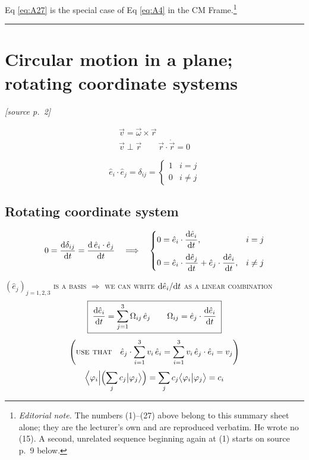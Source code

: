 \documentclass[11pt]{article}
\newcommand{\ehat}[1]{\hat{e}_{#1}}
\newcommand{\src}[1]{\par\nobreak\vspace{-4pt}\hfill{\footnotesize\itshape[source p.~#1]}\par\nobreak\vspace{2pt}}
\begin{document}
Eq \eqref{eq:A27} is the special case of Eq \eqref{eq:A4} in the CM Frame.\footnote{%
\emph{Editorial note.} The numbers (1)--(27) above belong to this summary sheet alone;
they are the lecturer's own and are reproduced verbatim. He wrote no (15). A second,
unrelated sequence beginning again at (1) starts on source p.~9 below.}

\bigskip\hrule\bigskip

\section*{Circular motion in a plane; rotating coordinate systems}
\src{2}

\begin{gather*}
\vec{v} = \vec{\omega}\times\vec{r}\\[2pt]
\vec{v}\perp\vec{r} \qquad \vec{r}\cdot\dot{\vec{r}} = 0
\end{gather*}

\begin{equation*}
\ehat{i}\cdot\ehat{j} = \delta_{ij} =
\begin{cases} 1 & i=j\\ 0 & i\neq j\end{cases}
\end{equation*}

\subsection*{Rotating coordinate system}

\begin{equation*}
0 = \frac{\d \delta_{ij}}{\d t} = \frac{\d\,\ehat{i}\cdot\ehat{j}}{\d t}
\quad\Longrightarrow\quad
\begin{cases}
0 = \ehat{i}\cdot\dfrac{\d\ehat{i}}{\d t}, & i=j\\[10pt]
0 = \ehat{i}\cdot\dfrac{\d\ehat{j}}{\d t} + \ehat{j}\cdot\dfrac{\d\ehat{i}}{\d t}, & i\neq j
\end{cases}
\end{equation*}

$(\ehat{j})_{j=1,2,3}$ \textsc{is a basis} $\Rightarrow$ \textsc{we can write}
$\d\ehat{i}/\d t$ \textsc{as a linear combination}
\begin{equation*}
\boxed{\;\frac{\d\ehat{i}}{\d t} = \sum_{j=1}^{3}\Omega_{ij}\,\ehat{j}
\qquad
\Omega_{ij} = \ehat{j}\cdot\frac{\d\ehat{i}}{\d t}\;}
\end{equation*}
\begin{equation*}
\left(\text{\textsc{use that}}\quad
\ehat{j}\cdot\sum_{i=1}^{3} v_i\,\ehat{i} = \sum_{i=1}^{3} v_i\,\ehat{j}\cdot\ehat{i} = v_j
\right)
\end{equation*}
\begin{equation*}
\Bigl\langle \varphi_i\Bigl|\Bigl(\sum_j c_j \bigl|\varphi_j\bigr\rangle\Bigr)
= \sum_j c_j \bigl\langle \varphi_i \big| \varphi_j \bigr\rangle = c_i
\end{equation*}
\end{document}
